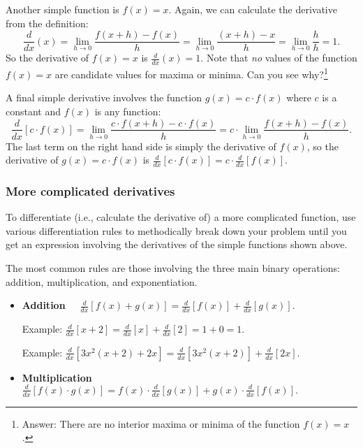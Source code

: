 \begin{CALCULUS}
Another simple function is $f(x)=x$. Again, we can calculate the derivative from the definition:
\[
\frac{d}{dx}(x) = \lim_{h\rightarrow 0} \frac{f(x+h) - f(x)}{h} = \lim_{h\rightarrow 0} \frac{(x+h) - x}{h} =\lim_{h\rightarrow 0} \frac{h}{h}=1.
\]
So the derivative of $f(x)=x$ is $\displaystyle \frac{d}{dx} (x) = 1$. Note that \emph{no} values of the function $f(x)=x$ are candidate values for maxima or minima. Can you see why?\footnote{Answer: There are no interior maxima or minima of the function $f(x)=x$.}

A final simple derivative involves the function $g(x) = c\cdot f(x)$ where $c$ is a constant and $f(x)$ is any function:
\[
\frac{d}{dx}[c\cdot f(x)] = \lim_{h\rightarrow 0} \frac{c\cdot f(x+h) - c\cdot f(x)}{h} = c\cdot \lim_{h\rightarrow 0} \frac{f(x+h) - f(x)}{h}.
\]
The last term on the right hand side is simply the derivative of $f(x)$, so the derivative of $g(x) = c\cdot f(x)$ is
$\displaystyle \frac{d}{dx}[c\cdot f(x)] = c\cdot \frac{d}{dx}[f(x)]$.






\subsubsection*{More complicated derivatives}

To differentiate (i.e., calculate the derivative of) a more complicated function, use various differentiation rules to methodically break down your problem until you get an expression involving the derivatives of the simple functions shown above.

The most common rules are those involving the three main binary operations: addition, multiplication, and exponentiation.
\begin{itemize}
\item \textbf{Addition}\ \ \ $\displaystyle \frac{d}{dx} \left[
f(x) + g(x) \right]  = \frac{d}{dx} \left[ f(x) \right] +
\frac{d}{dx} \left[ g(x) \right]$.

\medskip

Example: $\displaystyle \frac{d}{dx} \left[ x + 2 \right]  =
\frac{d}{dx} \left[ x \right] + \frac{d}{dx} \left[ 2 \right] = 1
+ 0 = 1.$

Example: $\displaystyle \frac{d}{dx} \left[ 3x^2(x+2) + 2x \right]
= \frac{d}{dx} \left[ 3x^2(x+2) \right] + \frac{d}{dx} \left[ 2x
\right].$

\medskip

\item \textbf{Multiplication}\ \ \  $\displaystyle \frac{d}{dx}
\left[ f(x)\cdot g(x) \right]  =  f(x)\cdot \frac{d}{dx} \left[
g(x) \right] + g(x) \cdot \frac{d}{dx} \left[ f(x) \right].$


\end{itemize}
\end{CALCULUS}
